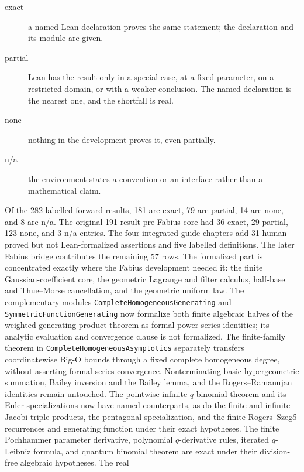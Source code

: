 \documentclass[11pt,a4paper,oneside,openany]{book}
\theoremstyle{definition}
\theoremstyle{remark}
\newcommand{\statusexact}{\textsf{\color{statusgreen}exact}}
\newcommand{\statuspartial}{\textsf{\color{statusamber}partial}}
\newcommand{\statusnone}{\textsf{\color{statusred}none}}
\newcommand{\statusna}{\textsf{n/a}}
\begin{document}
\begin{description}
\item[\statusexact] a named Lean declaration proves the same statement; the
  declaration and its module are given.
\item[\statuspartial] Lean has the result only in a special case, at a fixed
  parameter, on a restricted domain, or with a weaker conclusion.  The named
  declaration is the nearest one, and the shortfall is real.
\item[\statusnone] nothing in the development proves it, even partially.
\item[\statusna] the environment states a convention or an interface rather
  than a mathematical claim.
\end{description}

Of the 282 labelled forward results, 181 are \statusexact, 79 are
\statuspartial, 14 are \statusnone, and 8 are \statusna.  The original
191-result pre-Fabius core had 36 \statusexact, 29 \statuspartial, 123
\statusnone, and 3 \statusna{} entries.  The four integrated guide chapters
add 31 human-proved but not Lean-formalized assertions and five labelled
definitions.  The later Fabius bridge contributes the remaining 57 rows.
The formalized part is concentrated exactly where the Fabius development
needed it: the finite Gaussian-coefficient core, the geometric Lagrange and
filter calculus, half-base and Thue--Morse cancellation, and the geometric
uniform law.  The complementary modules
\texttt{CompleteHomogeneousGenerating} and
\texttt{SymmetricFunctionGenerating} now formalize both finite algebraic
halves of the weighted generating-product theorem as formal-power-series
identities; its analytic evaluation and convergence clause is not
formalized.  The finite-family theorem in
\texttt{CompleteHomogeneousAsymptotics} separately transfers coordinatewise
Big-O bounds through a fixed complete homogeneous degree, without asserting
formal-series convergence.  Nonterminating basic hypergeometric summation,
Bailey inversion and the Bailey lemma, and the Rogers--Ramanujan identities
remain untouched.  The pointwise infinite \(q\)-binomial theorem and its Euler
specializations now have named counterparts, as do the finite and infinite
Jacobi triple products, the pentagonal specialization, and the finite
Rogers--Szegő recurrences and generating function under their exact
hypotheses.  The finite Pochhammer parameter derivative, polynomial
\(q\)-derivative rules, iterated \(q\)-Leibniz formula, and quantum binomial
theorem are exact under their division-free algebraic hypotheses.  The real
\end{document}
